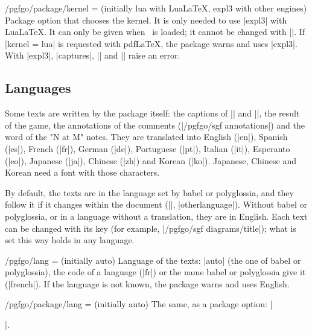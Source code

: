 \begin{goban}[9, stone = {radius = 4pt}, mark = {line = {color = red}}]
\begin{key}{/pgfgo/package/kernel =  (initially lua with Lua\LaTeX, expl3 with other engines)}
	Package option that chooses the kernel. It is only needed to use |expl3| with Lua\LaTeX. It can only be given when \pgfgoname\ is loaded; it cannot be changed with |\pgfgoset|. If |kernel = lua| is requested with pdf\LaTeX, the package warns and uses |expl3|. With |expl3|, |captures|, || and |\sgf| raise an error.

	\begin{codeexample}
		\usepackage[kernel = expl3]{pgf-go}
	\end{codeexample}
\end{key}

\subsection{Languages}
\label{subsec:languages}

Some texts are written by the package itself: the captions of |\sgfdiagrams| and |\sgfproblem|, the result of the game, the annotations of the comments (|/pgfgo/sgf annotations|) and the word of the "N at M" notes. They are translated into English (|en|), Spanish (|es|), French (|fr|), German (|de|), Portuguese (|pt|), Italian (|it|), Esperanto (|eo|), Japanese (|ja|), Chinese (|zh|) and Korean (|ko|). Japanese, Chinese and Korean need a font with those characters.

By default, the texts are in the language set by babel or polyglossia, and they follow it if it changes within the document (|\selectlanguage|, |otherlanguage|). Without babel or polyglossia, or in a language without a translation, they are in English. Each text can be changed with its key (for example, |/pgfgo/sgf diagrams/title|); what is set this way holds in any language.

\begin{key}{/pgfgo/lang =  (initially auto)}
	Language of the texts: |auto| (the one of babel or polyglossia), the code of a language (|fr|) or the name babel or polyglossia give it (|french|). If the language is not known, the package warns and uses English.

	\begin{codeexample}
	\end{codeexample}
\end{key}

\begin{key}{/pgfgo/package/lang =  (initially auto)}
	The same, as a package option: |\usepackage[lang = fr]{pgf-go}|.
\end{key}


\end{goban}

